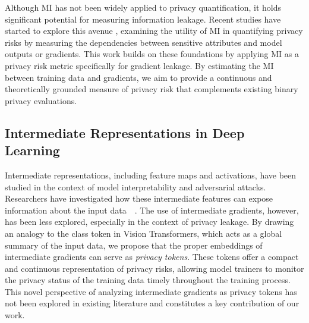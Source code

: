 Although MI has not been widely applied to privacy quantification, it holds significant potential for measuring information leakage. Recent studies have started to explore this avenue \cite{farokhi2020modelling} \cite{wang2021privacy}, examining the utility of MI in quantifying privacy risks by measuring the dependencies between sensitive attributes and model outputs or gradients. This work builds on these foundations by applying MI as a privacy risk metric specifically for gradient leakage. By estimating the MI between training data and gradients, we aim to provide a continuous and theoretically grounded measure of privacy risk that complements existing binary privacy evaluations.

\subsection{Intermediate Representations in Deep Learning}
Intermediate representations, including feature maps and activations, have been studied in the context of model interpretability and adversarial attacks. Researchers have investigated how these intermediate features can expose information about the input data~\cite{kurakin2016adversarial}~\cite{machado2021adversarial}. The use of intermediate gradients, however, has been less explored, especially in the context of privacy leakage. By drawing an analogy to the class token in Vision Transformers, which acts as a global summary of the input data, we propose that the proper embeddings of intermediate gradients can serve as \textit{privacy tokens}. These tokens offer a compact and continuous representation of privacy risks, allowing model trainers to monitor the privacy status of the training data timely throughout the training process. This novel perspective of analyzing intermediate gradients as privacy tokens has not been explored in existing literature and constitutes a key contribution of our work.


